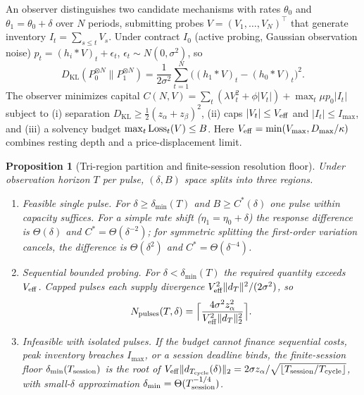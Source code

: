 \documentclass[12pt]{article}
\newtheorem{proposition}[theorem]{Proposition}
\theoremstyle{definition}
\theoremstyle{remark}
\newcommand{\KL}{D_{\mathrm{KL}}}
\begin{document}
An observer distinguishes two candidate mechanisms with rates $\theta_0$ and $\theta_1=\theta_0+\delta$ over $N$ periods, submitting probes $V=(V_1,\ldots,V_N)^\top$ that generate inventory $I_t=\sum_{s\le t}V_s$. Under contract $I_0$ (active probing, Gaussian observation noise) $p_t=(h_i*V)_t+\epsilon_t$, $\epsilon_t\sim N(0,\sigma^2)$, so
\begin{equation}\label{eq:klconv}
\KL(P_0^{\otimes N}\|P_1^{\otimes N})=\frac1{2\sigma^2}\sum_{t=1}^N\bigl((h_1*V)_t-(h_0*V)_t\bigr)^2 .
\end{equation}
The observer minimizes capital $C(N,V)=\sum_t(\lambda V_t^2+\phi|V_t|)+\max_t\mu p_0|I_t|$ subject to (i) separation $\KL\ge\tfrac12(z_\alpha+z_\beta)^2$, (ii) caps $|V_t|\le V_{\rm eff}$ and $|I_t|\le I_{\max}$, and (iii) a solvency budget $\max_t{\rm Loss}_t(V)\le B$. Here $V_{\rm eff}=\min(V_{\max},D_{\max}/\kappa)$ combines resting depth and a price-displacement limit.

\begin{proposition}[Tri-region partition and finite-session resolution floor]\label{prop:tri}
Under observation horizon $T$ per pulse, $(\delta,B)$ space splits into three regions.
\begin{enumerate}[label=(\roman*)]
\item \emph{Feasible single pulse.} For $\delta\ge\delta_{\min}(T)$ and $B\ge C^*(\delta)$ one pulse within capacity suffices. For a simple rate shift ($\eta_1=\eta_0+\delta$) the response difference is $\Theta(\delta)$ and $C^*=\Theta(\delta^{-2})$; for symmetric splitting the first-order variation cancels, the difference is $\Theta(\delta^2)$ and $C^*=\Theta(\delta^{-4})$.
\item \emph{Sequential bounded probing.} For $\delta<\delta_{\min}(T)$ the required quantity exceeds $V_{\rm eff}$. Capped pulses each supply divergence $V_{\rm eff}^2\|d_T\|^2/(2\sigma^2)$, so
\begin{equation}\label{eq:npulses}
N_{\rm pulses}(T,\delta)=\Bigl\lceil\frac{4\sigma^2z_\alpha^2}{V_{\rm eff}^2\|d_T\|_2^2}\Bigr\rceil .
\end{equation}
\item \emph{Infeasible with isolated pulses.} If the budget cannot finance sequential costs, peak inventory breaches $I_{\max}$, or a session deadline binds, the finite-session floor $\delta_{\min}(T_{\rm session})$ is the root of $V_{\rm eff}\|d_{T_{\rm cycle}}(\delta)\|_2=2\sigma z_\alpha/\sqrt{\lfloor T_{\rm session}/T_{\rm cycle}\rfloor}$, with small-$\delta$ approximation $\delta_{\min}=\Theta(T_{\rm session}^{-1/4})$.
\end{enumerate}
\end{proposition}
\end{document}
